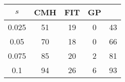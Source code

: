 \centering \begin{tabular}{c|c|c|c|c}
$s$	&CMH	&FIT	&GP	&\sc{Clear} \\\hline
0.025	&51	&19	&0	&43\\
0.05	&70	&18	&0	&66\\
0.075	&85	&20	&2	&81\\
0.1	&94	&26	&6	&93\\
\end{tabular}
